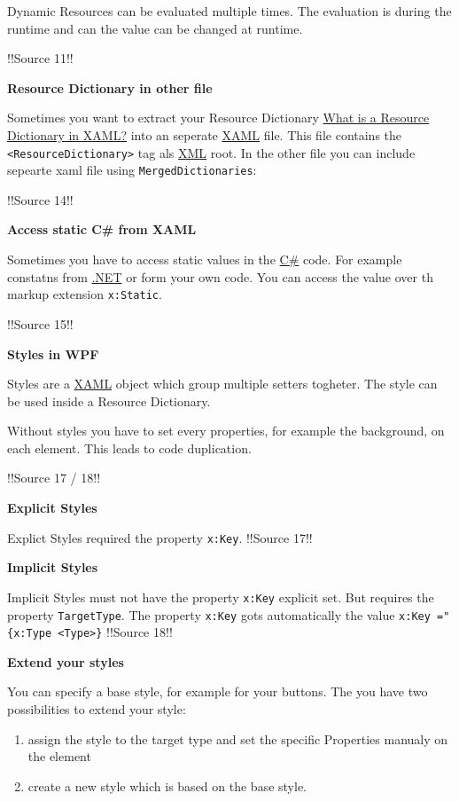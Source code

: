 \documentclass[10pt,twoside,landscape]{article}
\begin{document}
\begin{multicols}{3}
Dynamic Resources can be evaluated multiple times.
The evaluation is during the runtime and can the value can be changed at runtime.

!!Source 11!!

\textbf{Resource Dictionary in other file}

Sometimes you want to extract your Resource Dictionary \href{../../../roam/20211228120000-what_is_a_resource_dictionary_in_xaml.org}{What is a Resource Dictionary in XAML?} into an seperate \href{../../../roam/20211123162058-xaml.org}{XAML} file.
This file contains the \texttt{<ResourceDictionary>} tag als \href{../../../roam/20211112100344-xml.org}{XML} root.
In the other file you can include sepearte xaml file using \texttt{MergedDictionaries}:

!!Source 14!!

\textbf{Access static C\# from XAML}

Sometimes you have to access static values in the \href{../../../roam/20211003114158-c.org}{C\#} code.
For example constatns from \href{../../../roam/20211003114703-net.org}{.NET} or form your own code.
You can access the value over th markup extension \texttt{x:Static}.

!!Source 15!!

\textbf{Styles in WPF}

Styles are a \href{../../../roam/20211123162058-xaml.org}{XAML} object which group multiple setters togheter.
The style can be used inside a Resource Dictionary.

Without styles you have to set every properties, for example the background, on each element.
This leads to code duplication.

!!Source 17 / 18!!

\textbf{Explicit Styles}

Explict Styles required the property \texttt{x:Key}.
!!Source 17!!

\textbf{Implicit Styles}

Implicit Styles must not have the property \texttt{x:Key} explicit set.
But requires the property \texttt{TargetType}.
The property \texttt{x:Key} gots automatically the value \texttt{x:Key ="\{x:Type <Type>\}}
!!Source 18!!

\textbf{Extend your styles}

You can specify a base style, for example for your buttons.
The you have two possibilities to extend your style:
\begin{enumerate}
\item assign the style to the target type and set the specific Properties manualy on the element
\item create a new style which is based on the base style.
\end{enumerate}


\end{multicols}
\end{document}
